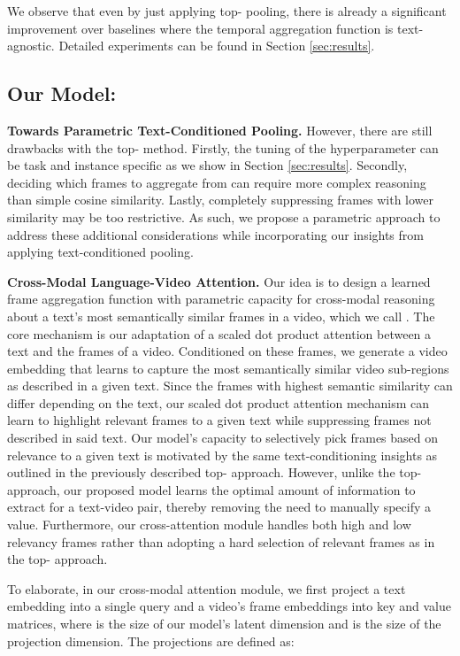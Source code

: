 \documentclass[10pt,twocolumn,letterpaper]{article}
\begin{document}
We observe that even by just applying top- pooling, there is already a significant improvement over baselines where the temporal aggregation function is text-agnostic. Detailed experiments can be found in Section \ref{sec:results}. 
\subsection{Our Model: \ModelName{}}
\label{sec:our-model}
\textbf{Towards Parametric Text-Conditioned Pooling.} However, there are still drawbacks with the top- method. Firstly, the tuning of the  hyperparameter can be task and instance specific as we show in Section \ref{sec:results}. Secondly, deciding which frames to aggregate from can require more complex reasoning than simple cosine similarity. Lastly, completely suppressing frames with lower similarity may be too restrictive. As such, we propose a parametric approach to address these additional considerations while incorporating our insights from applying text-conditioned pooling.


\textbf{Cross-Modal Language-Video Attention.} Our idea is to design a learned frame aggregation function with parametric capacity for cross-modal reasoning about a text's most semantically similar frames in a video, which we call \ModelName{}. The core mechanism is our adaptation of a scaled dot product attention \cite{vaswani2017attention} between a text and the frames of a video. Conditioned on these frames, we generate a video embedding that learns to capture the most semantically similar video sub-regions as described in a given text. Since the frames with highest semantic similarity can differ depending on the text, our scaled dot product attention mechanism can learn to highlight relevant frames to a given text while suppressing frames not described in said text. Our model's capacity to selectively pick frames based on relevance to a given text is motivated by the same text-conditioning insights as outlined in the previously described top- approach. However, unlike the top- approach, our proposed model learns the optimal amount of information to extract for a text-video pair, thereby removing the need to manually specify a  value. Furthermore, our cross-attention module handles both high and low relevancy frames rather than adopting a hard selection of relevant frames as in the top- approach.

To elaborate, in our cross-modal attention module, we first project a text embedding  into a single query  and a video's frame embeddings  into key  and value  matrices, where  is the size of our model's latent dimension and  is the size of the projection dimension. The projections are defined as:
\end{document}

